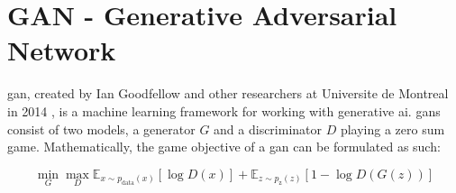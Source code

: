 \section{GAN - Generative Adversarial Network}

\acrfull{gan}, created by Ian Goodfellow and other researchers at Universite de Montreal in 2014 \cite{goodfellow2014generative, goodfellow2016nips}, is a machine learning framework for working with generative \acrshort{ai}. \acrshort{gan}s consist of two models, a generator $G$ and a discriminator $D$ playing a zero sum game. Mathematically, the game objective of a \acrshort{gan} can be formulated as such: 

\begin{equation}
    \min_{G}\max_{D}\mathbb{E}_{x\sim p_{\text{data}}(x)}[\log{D(x)}] +  \mathbb{E}_{z\sim p_{\text{z}}(z)}[1 - \log{D(G(z))}]
\end{equation}


